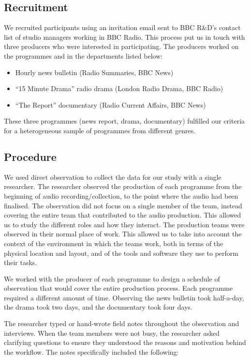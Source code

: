 \subsection{Recruitment}
We recruited participants using an invitation email sent to BBC R\&D's contact list of studio managers working in BBC
Radio. This process put us in touch with three producers who were interested in participating. The producers worked on
the programmes and in the departments listed below:
\begin{itemize}
	\item Hourly news bulletin (Radio Summaries, BBC News)
	\item ``15 Minute Drama'' radio drama (London Radio Drama, BBC Radio)
	\item ``The Report'' documentary (Radio Current Affairs, BBC News)
\end{itemize}

These three programmes (news report, drama, documentary) fulfilled our criteria for a heterogeneous sample of
programmes from different genres.

\subsection{Procedure}
We used direct observation to collect the data for our study with a single researcher. The researcher observed the
production of each programme from the beginning of audio recording/collection, to the point where the audio had been
finalised. The observation did not focus on a single member of the team, instead covering the entire team that
contributed to the audio production. This allowed us to study the different roles and how they interact.  The
production teams were observed in their normal place of work. This allowed us to take into account the context of the
environment in which the teams work, both in terms of the physical location and layout, and of the tools and software
they use to perform their tasks.

We worked with the producer of each programme to design a schedule of observation that would cover the entire
production process. Each programme required a different amount of time. Observing the news bulletin took half-a-day,
the drama took two days, and the documentary took four days. 

The researcher typed or hand-wrote field notes throughout the observation and interviews. When the team members were
not busy, the researcher asked clarifying questions to ensure they understood the reasons and motivation behind the
workflow. The notes specifically included the following:

